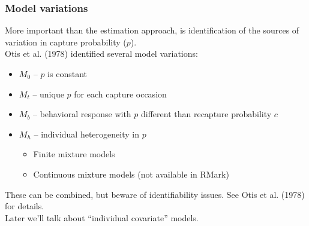 \documentclass[color=usenames,dvipsnames]{beamer}\usepackage[]{graphicx}\usepackage[]{color}
\begin{document}
\begin{frame}
  \frametitle{Model variations}
  \small
  More important than the estimation approach, is identification of
  the sources of variation in capture probability ($p$). \\ 
  \pause
  \vfill
  Otis et al. (1978) identified several model
  variations: 
  \begin{itemize}
    \small
    \item $M_0$ -- $p$ is constant
    \item $M_t$ -- unique $p$ for each capture occasion
    \item \hangindent=0.8cm $M_b$ -- behavioral response with $p$ different than
      recapture probability $c$
    \item $M_h$ -- individual heterogeneity in $p$
      \begin{itemize}
        \item Finite mixture models
        \item Continuous mixture models (not available in RMark)
      \end{itemize}
  \end{itemize}
  \pause \vfill
  These can be combined, but beware of identifiability issues. See
  Otis et al. (1978) for details.  \\
  \pause \vfill
  Later we'll talk about %
  ``individual covariate'' models.  
\end{frame}
\end{document}
